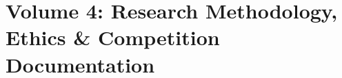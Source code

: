 \documentclass[10pt,twocolumn,a4paper]{article}
\begin{document}










\clearpage
\part{Volume 4: Research Methodology, Ethics \& Competition Documentation}












\end{document}
